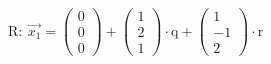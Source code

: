 \documentclass[preview]{standalone}
\begin{document}
\begin{center}
$\mathrm{R: \:} \vec{x_1} = \begin{pmatrix} 0 \\ 0 \\ 0 \end{pmatrix} + \begin{pmatrix} 1 \\ 2 \\ 1 \end{pmatrix} \cdot \mathrm{q} + \begin{pmatrix} 1 \\ -1 \\ 2 \end{pmatrix} \cdot \mathrm{r}$
\end{center}
\end{document}
